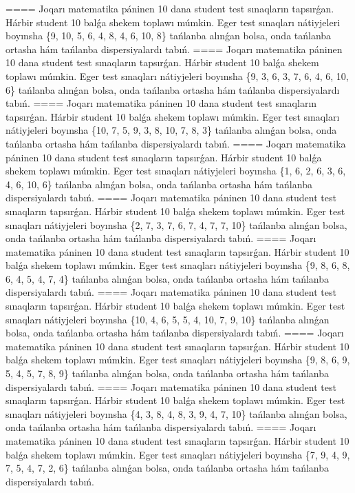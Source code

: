 ====
Joqarı matematika páninen 10 dana student test sınaqların tapsırǵan. Hárbir student 10 balǵa shekem toplawı múmkin. Eger test sınaqları nátiyjeleri boyınsha \{9, 10, 5, 6, 4, 8, 4, 6, 10, 8\} tańlanba alınǵan bolsa, onda tańlanba ortasha hám tańlanba dispersiyalardı tabıń.
====
Joqarı matematika páninen 10 dana student test sınaqların tapsırǵan. Hárbir student 10 balǵa shekem toplawı múmkin. Eger test sınaqları nátiyjeleri boyınsha \{9, 3, 6, 3, 7, 6, 4, 6, 10, 6\} tańlanba alınǵan bolsa, onda tańlanba ortasha hám tańlanba dispersiyalardı tabıń.
====
Joqarı matematika páninen 10 dana student test sınaqların tapsırǵan. Hárbir student 10 balǵa shekem toplawı múmkin. Eger test sınaqları nátiyjeleri boyınsha \{10, 7, 5, 9, 3, 8, 10, 7, 8, 3\} tańlanba alınǵan bolsa, onda tańlanba ortasha hám tańlanba dispersiyalardı tabıń.
====
Joqarı matematika páninen 10 dana student test sınaqların tapsırǵan. Hárbir student 10 balǵa shekem toplawı múmkin. Eger test sınaqları nátiyjeleri boyınsha \{1, 6, 2, 6, 3, 6, 4, 6, 10, 6\} tańlanba alınǵan bolsa, onda tańlanba ortasha hám tańlanba dispersiyalardı tabıń.
====
Joqarı matematika páninen 10 dana student test sınaqların tapsırǵan. Hárbir student 10 balǵa shekem toplawı múmkin. Eger test sınaqları nátiyjeleri boyınsha \{2, 7, 3, 7, 6, 7, 4, 7, 7, 10\} tańlanba alınǵan bolsa, onda tańlanba ortasha hám tańlanba dispersiyalardı tabıń.
====
Joqarı matematika páninen 10 dana student test sınaqların tapsırǵan. Hárbir student 10 balǵa shekem toplawı múmkin. Eger test sınaqları nátiyjeleri boyınsha \{9, 8, 6, 8, 6, 4, 5, 4, 7, 4\} tańlanba alınǵan bolsa, onda tańlanba ortasha hám tańlanba dispersiyalardı tabıń.
====
Joqarı matematika páninen 10 dana student test sınaqların tapsırǵan. Hárbir student 10 balǵa shekem toplawı múmkin. Eger test sınaqları nátiyjeleri boyınsha \{10, 4, 6, 5, 5, 4, 10, 7, 9, 10\} tańlanba alınǵan bolsa, onda tańlanba ortasha hám tańlanba dispersiyalardı tabıń.
====
Joqarı matematika páninen 10 dana student test sınaqların tapsırǵan. Hárbir student 10 balǵa shekem toplawı múmkin. Eger test sınaqları nátiyjeleri boyınsha \{9, 8, 6, 9, 5, 4, 5, 7, 8, 9\} tańlanba alınǵan bolsa, onda tańlanba ortasha hám tańlanba dispersiyalardı tabıń.
====
Joqarı matematika páninen 10 dana student test sınaqların tapsırǵan. Hárbir student 10 balǵa shekem toplawı múmkin. Eger test sınaqları nátiyjeleri boyınsha \{4, 3, 8, 4, 8, 3, 9, 4, 7, 10\} tańlanba alınǵan bolsa, onda tańlanba ortasha hám tańlanba dispersiyalardı tabıń.
====
Joqarı matematika páninen 10 dana student test sınaqların tapsırǵan. Hárbir student 10 balǵa shekem toplawı múmkin. Eger test sınaqları nátiyjeleri boyınsha \{7, 9, 4, 9, 7, 5, 4, 7, 2, 6\} tańlanba alınǵan bolsa, onda tańlanba ortasha hám tańlanba dispersiyalardı tabıń.
